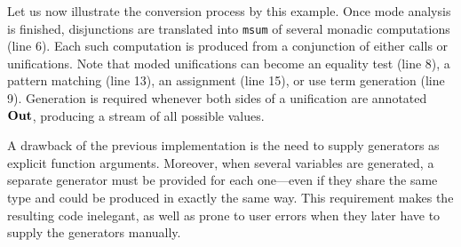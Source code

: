 Let us now illustrate the conversion process by this example. 
Once mode analysis is finished, disjunctions are translated into \lstinline{msum} of several monadic computations (line 6). 
Each such computation is produced from a conjunction of either calls or unifications. 
Note that moded unifications can become an equality test (line 8), a pattern matching (line 13), an assignment (line 15), or use term generation (line 9). 
Generation is required whenever both sides of a unification are annotated $\operatorname{\mathbf{Out}}$, producing a stream of all possible values. 

A drawback of the previous implementation is the need to supply generators as explicit function arguments. 
Moreover, when several variables are generated, a separate generator must be provided for each one—even if they share the same type and could be produced in exactly the same way. 
This requirement makes the resulting code inelegant, as well as prone to user errors when they later have to supply the generators manually.




